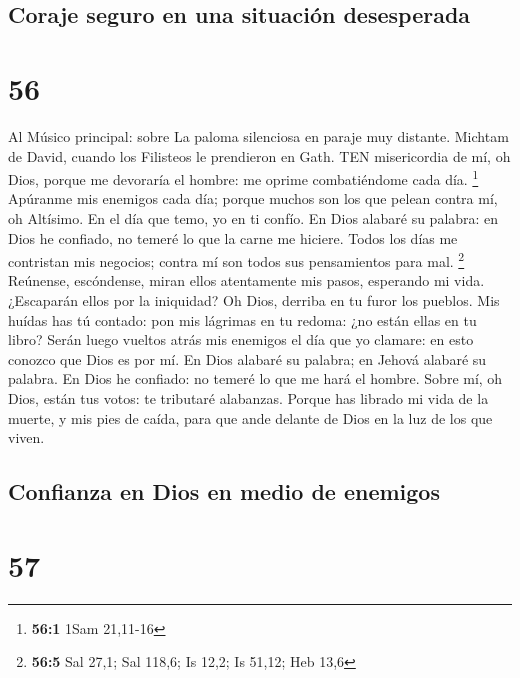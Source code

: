 \hypertarget{coraje-seguro-en-una-situaciuxf3n-desesperada}{%
\subsection{Coraje seguro en una situación
desesperada}\label{coraje-seguro-en-una-situaciuxf3n-desesperada}}

\hypertarget{section-55}{%
\section{56}\label{section-55}}

 Al Músico principal: sobre La paloma silenciosa en paraje
muy distante. Michtam de David, cuando los Filisteos le prendieron en
Gath. TEN misericordia de mí, oh Dios, porque me devoraría el hombre: me
oprime combatiéndome cada día. \footnote{\textbf{56:1} 1Sam 21,11-16}
 Apúranme mis enemigos cada día; porque muchos son los que
pelean contra mí, oh Altísimo.  En el día que temo, yo en ti
confío.  En Dios alabaré su palabra: en Dios he confiado, no
temeré lo que la carne me hiciere.  Todos los días me
contristan mis negocios; contra mí son todos sus pensamientos para mal.
\footnote{\textbf{56:5} Sal 27,1; Sal 118,6; Is 12,2; Is 51,12; Heb 13,6}
 Reúnense, escóndense, miran ellos atentamente mis pasos,
esperando mi vida.  ¿Escaparán ellos por la iniquidad? Oh
Dios, derriba en tu furor los pueblos.  Mis huídas has tú
contado: pon mis lágrimas en tu redoma: ¿no están ellas en tu libro?
 Serán luego vueltos atrás mis enemigos el día que yo
clamare: en esto conozco que Dios es por mí.  En Dios
alabaré su palabra; en Jehová alabaré su palabra.  En Dios
he confiado: no temeré lo que me hará el hombre.  Sobre mí,
oh Dios, están tus votos: te tributaré alabanzas.  Porque
has librado mi vida de la muerte, y mis pies de caída, para que ande
delante de Dios en la luz de los que viven.

\hypertarget{confianza-en-dios-en-medio-de-enemigos}{%
\subsection{Confianza en Dios en medio de
enemigos}\label{confianza-en-dios-en-medio-de-enemigos}}

\hypertarget{section-56}{%
\section{57}\label{section-56}}

